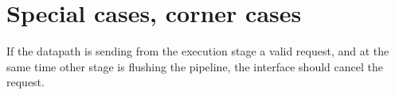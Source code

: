 \section{Special cases, corner cases}

If the datapath is sending from the execution stage a valid request, and at the same time other stage is flushing the pipeline, the interface should cancel the request.
